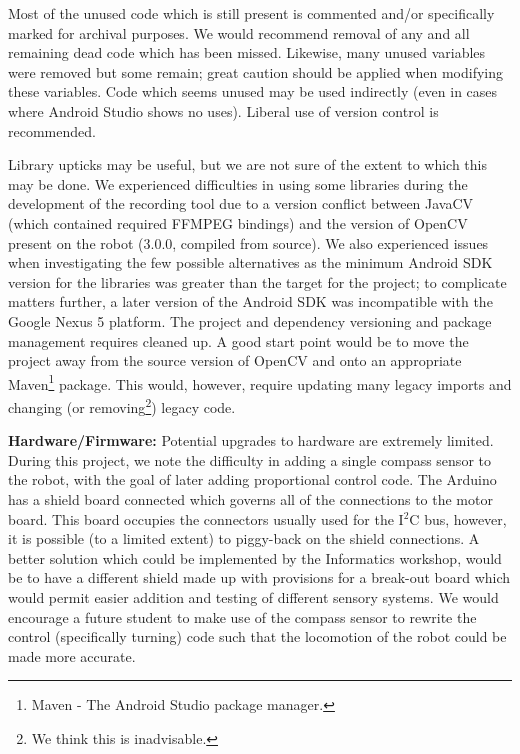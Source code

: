 \documentclass[a4paper,11pt,twoside,openright]{article}
\begin{document}
Most of the unused code which is still present is commented and/or
specifically marked for archival purposes. We would recommend removal
of any and all remaining dead code which has been missed. Likewise,
many unused variables were removed but some remain; great caution
should be applied when modifying these variables. Code which seems
unused may be used indirectly (even in cases where Android Studio
shows no uses). Liberal use of version control is recommended.
\newline\par

Library upticks may be useful, but we are not sure of the extent to
which this may be done. We experienced difficulties in using some
libraries during the development of the recording tool due to a
version conflict between JavaCV (which contained required FFMPEG
bindings) and the version of OpenCV present on the robot (3.0.0,
compiled from source). We also experienced issues when investigating
the few possible alternatives as the minimum Android SDK version for
the libraries was greater than the target for the project; to
complicate matters further, a later version of the Android SDK was
incompatible with the Google Nexus 5 platform. The project and
dependency versioning and package management requires cleaned up. A
good start point would be to move the project away from the source
version of OpenCV and onto an appropriate Maven\footnote{Maven - The
  Android Studio package manager.} package. This would, however,
require updating many legacy imports and changing (or
removing\footnote{We think this is inadvisable.}) legacy
code.\newline\par

\textbf{Hardware/Firmware:}
Potential upgrades to hardware are extremely limited. During this
project, we note the difficulty in adding a single compass sensor to
the robot, with the goal of later adding proportional control
code. The Arduino has a shield board connected which governs all of
the connections to the motor board. This board occupies the connectors
usually used for the I$^2$C bus, however, it is possible (to a limited
extent) to piggy-back on the shield connections. A better solution
which could be implemented by the Informatics workshop,
would be to have a different shield made up with provisions for a
break-out board which would permit easier addition and testing of
different sensory systems. We would encourage a future student to
make use of the compass sensor to rewrite the control (specifically
turning) code such that the locomotion of the robot could be made more
accurate.\newline\par
\end{document}
